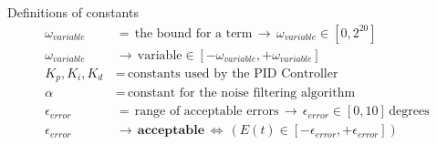 \documentclass{article}
\begin{document}
    Definitions of constants %
    \begin{align*}
        \omega_{variable}\, &=\, \text{the bound for a term}\, \longrightarrow\, \omega_{variable} \in [0, 2^{20}] \\
        \omega_{variable}\, &\rightarrow\, \text{variable} \in [-\omega_{variable}, +\omega_{variable}] \\
        K_{p}, K_{i}, K_{d}\, &=\, \text{constants used by the PID Controller} \\   
        \alpha\, &=\, \text{constant for the noise filtering algorithm} \\
        \epsilon_{error}\, &=\, \text{range of acceptable errors}\, \rightarrow\, \epsilon_{error} \in [0, 10]\, \text{degrees}\\
        \epsilon_{error}\, &\rightarrow\, \textbf{acceptable}\, \Leftrightarrow\, (E(t) \in [-\epsilon_{error}, +\epsilon_{error}]) \\  
    \end{align*}
\end{document}
